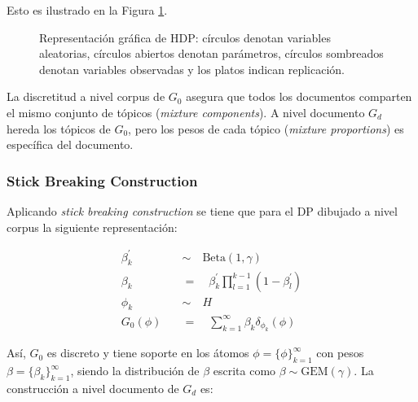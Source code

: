 \documentclass[letterpaper,12pt,oneside]{book} %
\begin{document}
Esto es ilustrado en la Figura \ref{img:hdp}.

\begin{figure}
  \centering
\caption{Representación gráfica de HDP: círculos denotan variables aleatorias, círculos abiertos denotan parámetros, círculos sombreados denotan variables observadas y los platos indican replicación.}
\label{img:hdp}
\end{figure}

La discretitud a nivel corpus de $G_{0}$ asegura que todos los documentos comparten el mismo conjunto de tópicos (\textit{mixture components}). A nivel documento $G_{d}$ hereda los tópicos de $G_{0}$, pero los pesos de cada tópico (\textit{mixture proportions}) es específica del documento.\\


\subsubsection{Stick Breaking Construction}
Aplicando \textit{stick breaking construction} se tiene que para el DP dibujado a nivel corpus la siguiente representación:

\begin{align}
    \beta_{k}^{'} \quad &\sim \quad \text{Beta}(1, \gamma) \\
    \beta_{k} \quad &= \quad \beta_{k}^{'}\prod_{l=1}^{k-1}(1-\beta_{l}^{'})\\
    \phi_{k} \quad &\sim \quad H  \\
    G_{0}(\phi) \quad &= \quad \sum_{k=1}^{\infty}\beta_{k}\delta_{\phi_{k}}(\phi)
\end{align}

Así, $G_{0}$ es discreto y tiene soporte en los átomos $\phi = \{\phi\}_{k=1}^{\infty}$ con pesos $\beta=\{\beta_{k}\}_{k=1}^{\infty}$, siendo la distribución de $\beta$ escrita como $\beta \sim \text{GEM}(\gamma)$. La construcción a nivel documento de $G_{d}$ es:
\end{document}
